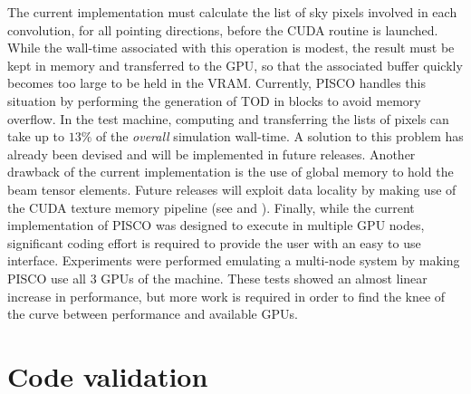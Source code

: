 \documentclass[a4paper,11pt]{article}
\begin{document}
The current implementation must calculate the list of sky pixels involved in each convolution, for all pointing directions, before the CUDA routine is launched. While the wall-time associated with this operation is modest, the result must be kept in memory and transferred to the GPU, so that the associated buffer quickly becomes too large to be held in the VRAM. Currently, PISCO handles this situation by performing the generation of TOD in blocks to avoid memory overflow. In the test machine, computing and transferring the lists of pixels can take up to $13\%$ of the \textsl{overall} simulation wall-time. A solution to this problem has already been devised and will be implemented in future releases. Another drawback of the current implementation is the use of global memory to hold the beam tensor elements. Future releases will exploit data locality by making use of the CUDA texture memory pipeline (see \cite{sanders2010cuda} and \cite{2019AW...Wilt}). Finally, while the current implementation of PISCO was designed to execute in multiple GPU nodes, significant coding effort is required to provide the user with an easy to use interface. Experiments were performed emulating a multi-node system by making PISCO use all 3 GPUs of the machine. These tests showed an almost linear increase in performance, but more work is required in order to find the knee of the curve between performance and available GPUs.




\section{Code validation}
\label{sec::validation}
\end{document}
